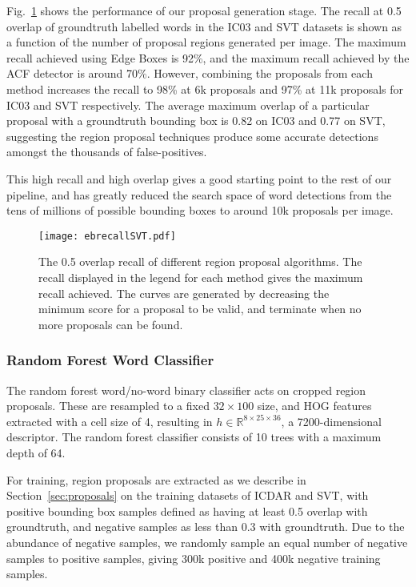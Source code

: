 \documentclass[twocolumn]{svjour3}          \smartqed  \usepackage{epsfig}
\begin{document}
Fig.~\ref{fig:ebrecall} shows the performance of our proposal generation stage. The recall at 0.5 overlap of groundtruth labelled words in the IC03 and SVT datasets is shown as a function of the number of proposal regions generated per image. The maximum recall achieved using Edge Boxes is 92\%, and the maximum recall achieved by the ACF detector is around 70\%. However, combining the proposals from each method increases the recall to 98\% at 6k proposals and 97\% at 11k proposals for IC03 and SVT respectively. The average maximum overlap of a particular proposal with a groundtruth bounding box is 0.82 on IC03 and 0.77 on SVT, suggesting the region proposal techniques produce some accurate detections amongst the thousands of false-positives. 

This high recall and high overlap gives a good starting point to the rest of our pipeline, and has greatly reduced the search space of word detections from the tens of millions of possible bounding boxes to around 10k proposals per image.

\begin{figure}
\begin{center}
\texttt{[image: ebrecallSVT.pdf]} 
\caption{The 0.5 overlap recall of different region proposal algorithms. The recall displayed in the legend for each method gives the maximum recall achieved. The curves are generated by decreasing the minimum score for a proposal to be valid, and terminate when no more proposals can be found.}
\label{fig:ebrecall}
\end{center}
\end{figure}

\subsubsection{Random Forest Word Classifier}
The random forest word/no-word binary classifier acts on cropped region proposals. These are resampled to a fixed $32 \times 100$ size, and HOG features extracted with a cell size of 4, resulting in $h \in \mathbb{R}^{8 \times 25 \times 36}$, a 7200-dimensional descriptor. The random forest classifier consists of 10 trees with a maximum depth of 64.

For training, region proposals are extracted as we describe in Section~\ref{sec:proposals} on the training datasets of ICDAR and SVT, with positive bounding box samples defined as having at least 0.5 overlap with groundtruth, and negative samples as less than 0.3 with groundtruth. Due to the abundance of negative samples, we randomly sample an equal number of negative samples to positive samples, giving 300k positive and 400k negative training samples.
\end{document}
